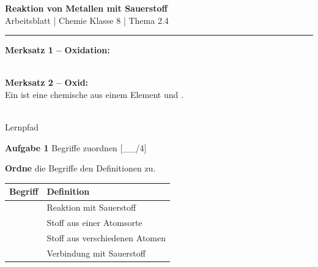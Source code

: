 \documentclass[10pt, a4paper]{article}
\newcommand{\fach}{Chemie}
\newcommand{\thema}{Reaktion von Metallen mit Sauerstoff}
\newcommand{\klasse}{8}
\newcommand{\luecke}[1]{\underline{\hspace{#1}}}
\newcommand{\punktebox}[1]{\hfill\small\textcolor{mittelgrau}{[\_\_/#1]}}
\newcommand{\aufgabe}[2]{%
    \vspace{6pt}%
    \noindent\textbf{\textcolor{fachfarbe}{Aufgabe #1}} #2%
    \vspace{3pt}%
    \nopagebreak[4]%
}
\newcommand{\operator}[1]{\textbf{\textcolor{fachfarbe}{#1}}}
\begin{document}

\begin{center}
    {\large\bfseries\textcolor{fachfarbe}{\thema}}\\[0.1em]
    {\small Arbeitsblatt | \fach{} Klasse \klasse{} | Thema 2.4}
\end{center}
\vspace{-0.4em}
\hrule
\vspace{0.4em}


\begin{merkkasten}
\begin{minipage}[t]{0.85\textwidth}
\textbf{Merksatz 1 – Oxidation:}\\[0.2em]
\luecke{13cm}\\[0.6em]
\luecke{13cm}

\vspace{0.5em}

\textbf{Merksatz 2 – Oxid:}\\[0.2em]
Ein \luecke{2cm} ist eine chemische \luecke{2.5cm} aus einem Element und \luecke{2.5cm}.
\end{minipage}%
\hfill
\begin{minipage}[t]{0.12\textwidth}
\raggedleft
{}\\
{\tiny Lernpfad}
\end{minipage}
\end{merkkasten}


\aufgabe{1}{Begriffe zuordnen} \punktebox{4}

\operator{Ordne} die Begriffe den Definitionen zu.

\small
\begin{tabular}{|p{3cm}|p{10cm}|}
\hline
\textbf{Begriff} & \textbf{Definition} \\
\hline
& Reaktion mit Sauerstoff \\
\hline
& Stoff aus einer Atomsorte \\
\hline
& Stoff aus verschiedenen Atomen \\
\hline
& Verbindung mit Sauerstoff \\
\hline
\end{tabular}
\end{document}
